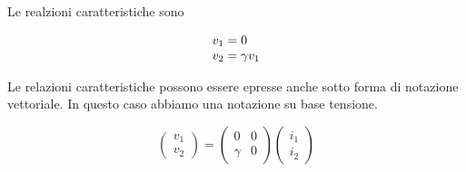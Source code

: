 \documentclass[a4paper]{report}
\begin{document}
Le realzioni caratteristiche sono

\[
\begin{array}{l l}
  v_1=0\\
  v_2=\gamma v_1
\end{array}
\]

Le relazioni caratteristiche possono essere epresse anche sotto forma
di notazione vettoriale. In questo caso abbiamo una notazione su base
tensione.

\[
\left(
\begin{array}{c}
  v_1\\
  v_2
\end{array}
\right)=
\begin{pmatrix}
  0 & 0\\
  \gamma & 0
\end{pmatrix}
\left(
\begin{array}{c}
  i_1\\
  i_2
\end{array}
\right)
\]
\end{document}
